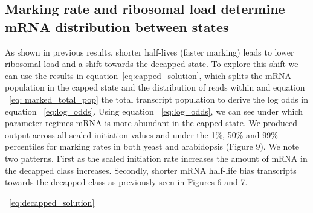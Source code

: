 \documentclass[review]{elsarticle}
\begin{document}
\subsection{Marking rate and ribosomal load determine mRNA distribution between states}
As shown in previous results, shorter half-lives (faster marking) leads to lower ribosomal load and a shift towards the decapped state. To explore this shift we can use the results in equation~\ref{eq:capped_solution}, which splits the mRNA population in the capped state and the distribution of reads within and equation ~\ref{eq:  marked_total_pop} the total transcript population to derive the log odds in equation ~\ref{eq:log_odds}. Using equation ~\ref{eq:log_odds}, we can see under which parameter regimes mRNA is more abundant in the capped state. We produced output across all scaled initiation values and under the 1\%, 50\% and 99\% percentiles for marking rates in both yeast and arabidopsis (Figure 9). We note two patterns. First as the scaled initiation rate increases the amount of mRNA in the decapped class increases. Secondly, shorter mRNA half-life bias transcripts towards the decapped class as previously seen in Figures 6 and 7.  


~\ref{eq:decapped_solution}


\end{document}
